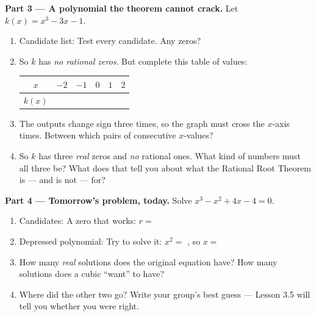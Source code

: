 \documentclass[10pt]{article}
\begin{document}
\begin{tcolorbox}[colback=white, colframe=black!40, title=\textbf{Tier E --- Extension},
    fonttitle=\bfseries, arc=1.5mm, left=3mm, right=3mm, top=2mm, bottom=2mm, breakable]
\vspace{5pt}
\textbf{Part 3 --- A polynomial the theorem cannot crack.} Let $k(x) = x^3 - 3x - 1$.
\begin{enumerate}[label=(\alph*), leftmargin=1.8em, itemsep=6pt]
  \item Candidate list:  \; Test every candidate. Any zeros? 
  \item So $k$ has \emph{no rational zeros}. But complete this table of values:
    \begin{center}
    \renewcommand{\arraystretch}{1.4}
    \begin{tabular}{|c|C{1.3cm}|C{1.3cm}|C{1.3cm}|C{1.3cm}|C{1.3cm}|}
    \hline
    $x$ & $-2$ & $-1$ & $0$ & $1$ & $2$ \\ \hline
    $k(x)$ &  &  &  &  &  \\ \hline
    \end{tabular}
    \end{center}
  \item The outputs change sign three times, so the graph must cross the $x$-axis
         times. Between which pairs of consecutive $x$-values?
  \item So $k$ has three \emph{real} zeros and \emph{no} rational ones. What kind of numbers must
        all three be?  \; What does that tell you about what the Rational Root
        Theorem is --- and is not --- for? 
\end{enumerate}

\vspace{5pt}
\textbf{Part 4 --- Tomorrow's problem, today.} Solve $x^3 - x^2 + 4x - 4 = 0$.
\begin{enumerate}[label=(\alph*), leftmargin=1.8em, itemsep=6pt]
  \item Candidates:  \; A zero that works: $r = $ 
  \item Depressed polynomial:  \; Try to solve it: $x^2 = $ , so
        $x = $ 
  \item How many \emph{real} solutions does the original equation have?  \;
        How many solutions does a cubic ``want'' to have? 
  \item Where did the other two go? Write your group's best guess --- Lesson 3.5 will tell you
        whether you were right. 
\end{enumerate}
\end{tcolorbox}
\end{document}
